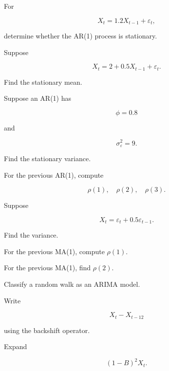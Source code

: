 \begin{exercise}[2]
For

\[
X_t
=
1.2X_{t-1}
+
\varepsilon_t,
\]

determine whether the AR(1) process is stationary.
\end{exercise}

\begin{exercise}[2]
Suppose

\[
X_t
=
2
+
0.5X_{t-1}
+
\varepsilon_t.
\]

Find the stationary mean.
\end{exercise}

\begin{exercise}[2]
Suppose an AR(1) has

\[
\phi=0.8
\]

and

\[
\sigma_\varepsilon^2=9.
\]

Find the stationary variance.
\end{exercise}

\begin{exercise}[2]
For the previous AR(1), compute

\[
\rho(1),
\quad
\rho(2),
\quad
\rho(3).
\]
\end{exercise}

\begin{exercise}[2]
Suppose

\[
X_t
=
\varepsilon_t
+
0.5\varepsilon_{t-1}.
\]

Find the variance.
\end{exercise}

\begin{exercise}[2]
For the previous MA(1), compute \(\rho(1)\).
\end{exercise}

\begin{exercise}[2]
For the previous MA(1), find \(\rho(2)\).
\end{exercise}

\begin{exercise}[2]
Classify a random walk as an ARIMA model.
\end{exercise}

\begin{exercise}[2]
Write

\[
X_t-X_{t-12}
\]

using the backshift operator.
\end{exercise}

\begin{exercise}[2]
Expand

\[
(1-B)^2X_t.
\]
\end{exercise}

